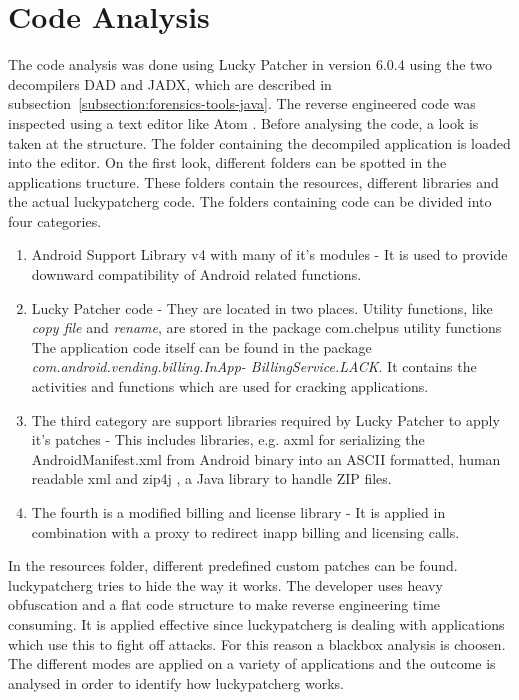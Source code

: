 \section{Code Analysis} \label{section:luckypatcher-analysis}
The code analysis was done using Lucky Patcher in version 6.0.4 using the two decompilers DAD and JADX, which are described in subsection~\ref{subsection:forensics-tools-java}.
The reverse engineered code was inspected using a text editor like Atom \cite{atom}.
Before analysing the code, a look is taken at the structure.
\newline
The folder containing the decompiled application is loaded into the editor.
On the first look, different folders can be spotted in the applications tructure.
These folders contain the resources, different libraries and the actual \gls{luckypatcherg} code.
The folders containing code can be divided into four categories.
\begin{enumerate}
\item Android Support Library v4 with many of it's modules -
It is used to provide downward compatibility of Android related functions.
\item Lucky Patcher code -
They are located in two places.
Utility functions, like \textit{copy file} and \textit{rename}, are stored in the package com.chelpus utility functions
The application code itself can be found in the package
\textit{com.android.vending.billing.InApp- BillingService.LACK}.
It contains the activities and functions which are used for cracking applications.
\item The third category are support libraries required by Lucky Patcher to apply it's patches -
This includes libraries, e.g. axml \cite{axml} for serializing the AndroidManifest.xml from Android binary into an ASCII formatted, human readable xml and zip4j \cite{zip4j}, a Java library to handle ZIP files.
\item The fourth is a modified billing and license library -
It is applied in combination with a proxy to redirect inapp billing and licensing calls.
\end{enumerate}
In the resources folder, different predefined custom patches can be found.
\newline
\newline
\gls{luckypatcherg} tries to hide the way it works.
The developer uses heavy obfuscation and a flat code structure to make reverse engineering time consuming.
It is applied effective since \gls{luckypatcherg} is dealing with applications which use this to fight off attacks.
For this reason a blackbox analysis is choosen.
The different modes are applied on a variety of applications and the outcome is analysed in order to identify how \gls{luckypatcherg} works.
